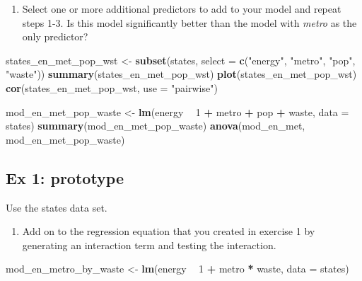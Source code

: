 \documentclass[]{book}
\newenvironment{Shaded}{\begin{snugshade}}{\end{snugshade}}
\newcommand{\KeywordTok}[1]{\textcolor[rgb]{0.13,0.29,0.53}{\textbf{#1}}}
\newcommand{\DataTypeTok}[1]{\textcolor[rgb]{0.13,0.29,0.53}{#1}}
\newcommand{\DecValTok}[1]{\textcolor[rgb]{0.00,0.00,0.81}{#1}}
\newcommand{\StringTok}[1]{\textcolor[rgb]{0.31,0.60,0.02}{#1}}
\newcommand{\OperatorTok}[1]{\textcolor[rgb]{0.81,0.36,0.00}{\textbf{#1}}}
\newcommand{\NormalTok}[1]{#1}
\providecommand{\tightlist}{%
  \setlength{\itemsep}{0pt}\setlength{\parskip}{0pt}}
\begin{document}
\begin{enumerate}
\def\labelenumi{\arabic{enumi}.}
\setcounter{enumi}{3}
\tightlist
\item
  Select one or more additional predictors to add to your model and
  repeat steps 1-3. Is this model significantly better than the model
  with \emph{metro} as the only predictor?
\end{enumerate}

\begin{Shaded}
\begin{Highlighting}[]
\NormalTok{  states_en_met_pop_wst <-}\StringTok{ }\KeywordTok{subset}\NormalTok{(states, }\DataTypeTok{select =} \KeywordTok{c}\NormalTok{(}\StringTok{"energy"}\NormalTok{, }\StringTok{"metro"}\NormalTok{, }\StringTok{"pop"}\NormalTok{, }\StringTok{"waste"}\NormalTok{))}
  \KeywordTok{summary}\NormalTok{(states_en_met_pop_wst)}
  \KeywordTok{plot}\NormalTok{(states_en_met_pop_wst)}
  \KeywordTok{cor}\NormalTok{(states_en_met_pop_wst, }\DataTypeTok{use =} \StringTok{"pairwise"}\NormalTok{)}

\NormalTok{  mod_en_met_pop_waste <-}\StringTok{ }\KeywordTok{lm}\NormalTok{(energy }\OperatorTok{~}\StringTok{ }\DecValTok{1} \OperatorTok{+}\StringTok{ }\NormalTok{metro }\OperatorTok{+}\StringTok{ }\NormalTok{pop }\OperatorTok{+}\StringTok{ }\NormalTok{waste, }\DataTypeTok{data =}\NormalTok{ states)}
  \KeywordTok{summary}\NormalTok{(mod_en_met_pop_waste)}
  \KeywordTok{anova}\NormalTok{(mod_en_met, mod_en_met_pop_waste)}
\end{Highlighting}
\end{Shaded}

\subsection{Ex 1: prototype}\label{ex-1-prototype-1}

Use the states data set.

\begin{enumerate}
\def\labelenumi{\arabic{enumi}.}
\tightlist
\item
  Add on to the regression equation that you created in exercise 1 by
  generating an interaction term and testing the interaction.
\end{enumerate}

\begin{Shaded}
\begin{Highlighting}[]
\NormalTok{  mod_en_metro_by_waste <-}\StringTok{ }\KeywordTok{lm}\NormalTok{(energy }\OperatorTok{~}\StringTok{ }\DecValTok{1} \OperatorTok{+}\StringTok{ }\NormalTok{metro }\OperatorTok{*}\StringTok{ }\NormalTok{waste, }\DataTypeTok{data =}\NormalTok{ states)}
\end{Highlighting}
\end{Shaded}
\end{document}
